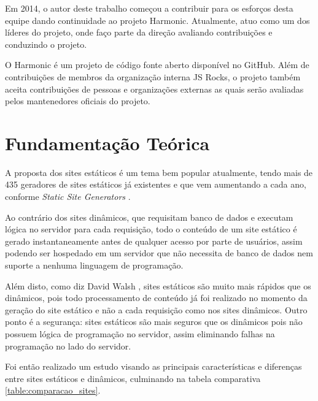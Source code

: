 \documentclass[ppginf, pep]{esinucpel}
\begin{document}
Em 2014, o autor deste trabalho começou a contribuir para os esforços desta equipe dando continuidade ao projeto Harmonic. Atualmente, atuo como um dos líderes do projeto, onde faço parte da direção avaliando contribuições e conduzindo o projeto.

O Harmonic é um projeto de código fonte aberto disponível no GitHub. Além de contribuições de membros da organização interna JS Rocks, o projeto também aceita contribuições de pessoas e organizações externas as quais serão avaliadas pelos mantenedores oficiais do projeto.

\chapter{Fundamentação Teórica}

A proposta dos sites estáticos é um tema bem popular atualmente, tendo mais de 435 geradores de sites estáticos já existentes e que vem aumentando a cada ano, conforme \textit{Static Site Generators} \cite{staticsitegenerators}.

Ao contrário dos sites dinâmicos, que requisitam banco de dados e executam lógica no servidor para cada requisição, todo o conteúdo de um site estático é gerado instantaneamente antes de qualquer acesso por parte de usuários, assim podendo ser hospedado em um servidor que não necessita de banco de dados nem suporte a nenhuma linguagem de programação.

Além disto, como diz David Walsh \cite{dwb}, sites estáticos são muito mais rápidos que os dinâmicos, pois todo processamento de conteúdo já foi realizado no momento da geração do site estático e não a cada requisição como nos sites dinâmicos. Outro ponto é a segurança: sites estáticos são mais seguros que os dinâmicos pois não possuem lógica de programação no servidor, assim eliminando falhas na programação no lado do servidor.

Foi então realizado um estudo visando as principais características e diferenças entre sites estáticos e dinâmicos, culminando na tabela comparativa \ref{table:comparacao_sites}.
\end{document}
